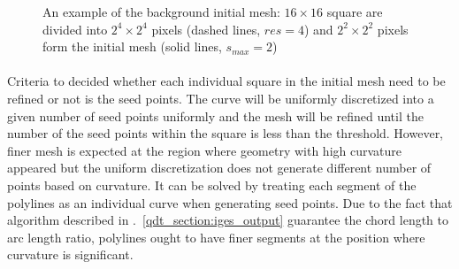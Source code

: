\begin{figure}[!ht]
    \centering
    \caption{An example of the background initial mesh: $16 \times 16$ square are divided into $2^4 \times 2^4$ pixels (dashed lines, $res=4$) and $2^2 \times 2^2$ pixels form the initial mesh (solid lines, $s_{max}=2$)}
    \label{qdt_fig:qdt_initial_mesh}
\end{figure}

\paragraph{}
Criteria to decided whether each individual square in the initial mesh need to be refined or not is the seed points.
The curve will be uniformly discretized into a given number of seed points uniformly and the mesh will be refined until the number of the seed points within the square is less than the threshold.
However, finer mesh is expected at the region where geometry with high curvature appeared but the uniform discretization does not generate different number of points based on curvature.
It can be solved by treating each segment of the polylines as an individual curve when generating seed points.
Due to the fact that algorithm described in .~\ref{qdt_section:iges_output} guarantee the chord length to arc length ratio, polylines ought to have finer segments at the position where curvature is significant.

